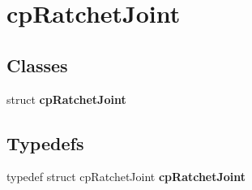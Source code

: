 \hypertarget{group__cp_ratchet_joint}{\section{cp\-Ratchet\-Joint}
\label{group__cp_ratchet_joint}
}
\subsection*{Classes}
\begin{DoxyCompactItemize}
\item 
struct {\bfseries cp\-Ratchet\-Joint}
\end{DoxyCompactItemize}
\subsection*{Typedefs}
\begin{DoxyCompactItemize}
\item 
\hypertarget{group__cp_ratchet_joint_ga5a114b51c04b7de6d6300a901fc32ec3}{typedef struct cp\-Ratchet\-Joint {\bfseries cp\-Ratchet\-Joint}}\label{group__cp_ratchet_joint_ga5a114b51c04b7de6d6300a901fc32ec3}

\end{DoxyCompactItemize}
